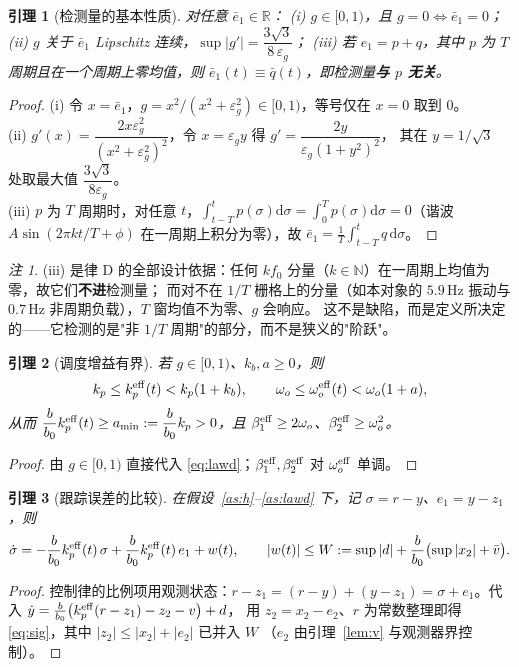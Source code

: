 \documentclass[11pt,a4paper]{article}
\newtheorem{lemma}{引理}
\theoremstyle{remark}
\newtheorem{remark}{注}
\begin{document}
\begin{lemma}[检测量的基本性质]\label{lem:det}
对任意 $\bar e_1\in\mathbb R$：
(i) $g\in[0,1)$，且 $g=0\iff\bar e_1=0$；
(ii) $g$ 关于 $\bar e_1$ Lipschitz 连续，$\sup|g'|=\dfrac{3\sqrt3}{8\,\varepsilon_g}$；
(iii) 若 $e_1=p+q$，其中 $p$ 为 $T$ 周期且在一个周期上零均值，则 $\bar e_1(t)\equiv \bar q(t)$，即检测量\textbf{与 $p$ 无关}。
\end{lemma}
\begin{proof}
(i) 令 $x=\bar e_1$，$g=x^2/(x^2+\varepsilon_g^2)\in[0,1)$，等号仅在 $x=0$ 取到 $0$。\\
(ii) $g'(x)=\dfrac{2x\varepsilon_g^2}{(x^2+\varepsilon_g^2)^2}$，令 $x=\varepsilon_g y$ 得 $g'=\dfrac{2y}{\varepsilon_g(1+y^2)^2}$，
其在 $y=1/\sqrt3$ 处取最大值 $\dfrac{3\sqrt3}{8\varepsilon_g}$。\\
(iii) $p$ 为 $T$ 周期时，对任意 $t$，$\int_{t-T}^{t}p(\sigma)\mathrm d\sigma=\int_{0}^{T}p(\sigma)\mathrm d\sigma=0$（谐波 $A\sin(2\pi k t/T+\phi)$ 在一周期上积分为零），故 $\bar e_1=\frac1T\int_{t-T}^{t}q\,\mathrm d\sigma$。
\end{proof}
\begin{remark}
(iii) 是律 D 的全部设计依据：任何 $k f_0$ 分量（$k\in\mathbb N$）在一周期上均值为零，故它们\textbf{不进}检测量；
而对不在 $1/T$ 栅格上的分量（如本对象的 $5.9$\,Hz 振动与 $0.7$\,Hz 非周期负载），$T$ 窗均值不为零、$g$ 会响应。
这不是缺陷，而是定义所决定的——它检测的是"非 $1/T$ 周期"的部分，而不是狭义的"阶跃"。
\end{remark}

\begin{lemma}[调度增益有界]\label{lem:kpgain}
若 $g\in[0,1)$、$k_b,a\ge0$，则
\begin{equation}
k_p\le k_p^{\rm eff}(t)<k_p(1+k_b),\qquad
\omega_o\le \omega_o^{\rm eff}(t)<\omega_o(1+a),
\label{eq:kpgain}
\end{equation}
从而 $\dfrac{b}{b_0}k_p^{\rm eff}(t)\ge a_{\min}:=\dfrac{b}{b_0}k_p>0$，且
$\beta_1^{\rm eff}\ge 2\omega_o$、$\beta_2^{\rm eff}\ge\omega_o^{2}$。
\end{lemma}
\begin{proof}
由 $g\in[0,1)$ 直接代入 \eqref{eq:lawd}；$\beta_1^{\rm eff},\beta_2^{\rm eff}$ 对 $\omega_o^{\rm eff}$ 单调。
\end{proof}

\begin{lemma}[跟踪误差的比较]\label{lem:track-cmp}
在假设~\ref{as:h}--\ref{as:lawd} 下，记 $\sigma=r-y$、$e_1=y-z_1$，则
\begin{equation}
\dot\sigma=-\frac{b}{b_0}k_p^{\rm eff}(t)\,\sigma+\frac{b}{b_0}k_p^{\rm eff}(t)\,e_1+w(t),\qquad
|w(t)|\le W:=\sup|d|+\frac{b}{b_0}\bigl(\sup|x_2|+\bar v\bigr).
\label{eq:sig}
\end{equation}
\end{lemma}
\begin{proof}
控制律的比例项用观测状态：$r-z_1=(r-y)+(y-z_1)=\sigma+e_1$。代入
$\dot y=\frac{b}{b_0}\bigl(k_p^{\rm eff}(r-z_1)-z_2-v\bigr)+d$，
用 $z_2=x_2-e_2$、$r$ 为常数整理即得 \eqref{eq:sig}，其中 $|z_2|\le|x_2|+|e_2|$ 已并入 $W$
（$e_2$ 由引理~\ref{lem:v} 与观测器界控制）。
\end{proof}
\end{document}
